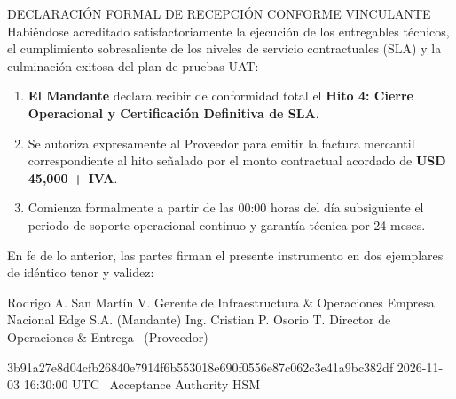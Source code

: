 \documentclass[11pt,letterpaper]{article}
\begin{document}
\begin{corpdirective}{DECLARACI\'ON FORMAL DE RECEPCI\'ON CONFORME VINCULANTE}
  Habi\'endose acreditado satisfactoriamente la ejecuci\'on de los entregables t\'ecnicos, el cumplimiento sobresaliente de los niveles de servicio contractuales (SLA) y la culminaci\'on exitosa del plan de pruebas UAT:
  \begin{enumerate}[leftmargin=1.5em, itemsep=2pt, topsep=2pt]
    \item \textbf{El Mandante} declara recibir de conformidad total el \textbf{Hito 4: Cierre Operacional y Certificaci\'on Definitiva de SLA}.
    \item Se autoriza expresamente al Proveedor \textbf{\corporatebrandlegal} para emitir la factura mercantil correspondiente al hito se\~nalado por el monto contractual acordado de \textbf{USD 45,000 + IVA}.
    \item Comienza formalmente a partir de las 00:00 horas del d\'ia subsiguiente el periodo de soporte operacional continuo y garant\'ia técnica por 24 meses.
  \end{enumerate}
\end{corpdirective}

\vspace{0.8em}

\noindent En fe de lo anterior, las partes firman el presente instrumento en dos ejemplares de id\'entico tenor y validez:

\dualcontrolsignature
  {Rodrigo A. San Mart\'in V.}
  {Gerente de Infraestructura \& Operaciones}
  {Empresa Nacional Edge S.A. (Mandante)}
  {Ing. Cristian P. Osorio T.}
  {Director de Operaciones \& Entrega}
  {\corporatebrandlegal\ (Proveedor)}

\vspace{1.0em}

\cryptoseal
  {3b91a27e8d04cfb26840e7914f6b553018e690f0556e87c062c3e41a9bc382df}
  {2026-11-03 16:30:00 UTC}
  {\corporatebrandname\ Acceptance Authority HSM}
\end{document}
